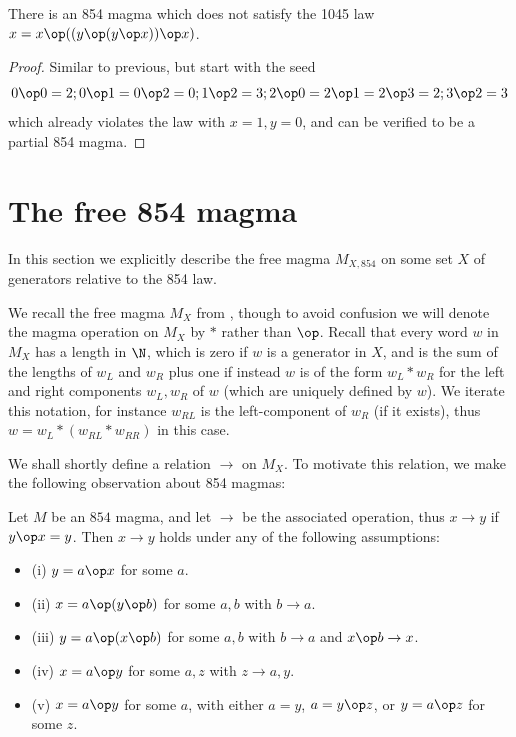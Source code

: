 \begin{corollary}\leanok{}\label{854-1045}  There is an 854 magma which does not satisfy the 1045 law $x = x \op ((y \op (y \op x)) \op x)$.
\end{corollary}

\begin{proof} Similar to previous, but start with the seed
$$ 0 \op 0 = 2; 0 \op 1 = 0 \op 2 = 0; 1 \op 2 = 3; 2 \op 0 = 2 \op 1 = 2 \op 3 = 2; 3 \op 2 = 3$$
which already violates the law with $x=1,y=0$, and can be verified to be a partial 854 magma.
\end{proof}

\section{The free 854 magma}

In this section we explicitly describe the free magma $M_{X, 854}$ on some set $X$ of generators relative to the 854 law.

We recall the free magma $M_X$ from , though to avoid confusion we will denote the magma operation on $M_X$ by $*$ rather than $\op$.  Recall that every word $w$ in $M_X$ has a length in $\N$, which is zero if $w$ is a generator in $X$, and is the sum of the lengths of $w_L$ and $w_R$ plus one if instead $w$ is of the form $w_L * w_R$ for the left and right components $w_L, w_R$ of $w$ (which are uniquely defined by $w$).  We iterate this notation, for instance $w_{RL}$ is the left-component of $w_R$ (if it exists), thus $w = w_L * (w_{RL} * w_{RR})$ in this case.

We shall shortly define a relation $\to$ on $M_X$.  To motivate this relation, we make the following observation about 854 magmas:

\begin{lemma}\label{854-relation}  Let $M$ be an $854$ magma, and let $\to$ be the associated operation, thus $x \to y$ if $y \op x = y$.  Then $x \to y$ holds under any of the following assumptions:
  \begin{itemize}
  \item (i) $y = a \op x$ for some $a$.
  \item (ii) $x = a \op (y \op b)$ for some $a,b$ with $b \to a$.
  \item (iii) $y = a \op (x \op b)$ for some $a,b$ with $b \to a$ and $x \op b \to x$.
  \item (iv) $x = a \op y$ for some $a,z$ with $z \to a, y$.
  \item (v) $x = a \op y$ for some $a$, with either $a=y$, $a = y \op z$, or $y = a \op z$ for some $z$.
  \end{itemize}
\end{lemma}

